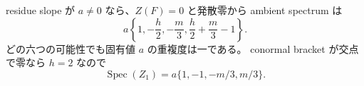 residue slope が $a\ne0$ なら、$Z(F)=0$ と発散零から ambient spectrum は
\begin{equation}\label{eq:line-spectrum-node}
 a\left\{1,-\frac h2,-\frac m3,\frac h2+\frac m3-1\right\}.
\end{equation}
どの六つの可能性でも固有値 $a$ の重複度は一である。
conormal bracket が交点で零なら $h=2$ なので
\[
 \operatorname{Spec}(Z_1)=a\{1,-1,-m/3,m/3\}.
 \tag{LS2}
\]

